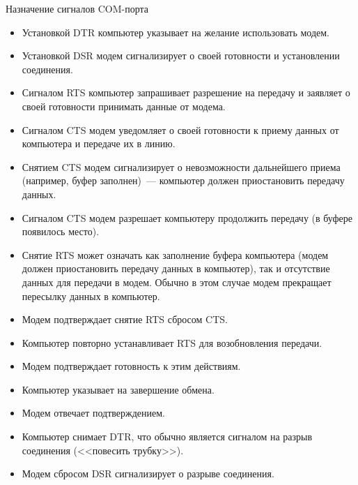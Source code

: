 \documentclass[aspectratio=169,14pt]{beamer}
\begin{document}
\begin{frame}{Назначение сигналов COM-порта}
    \begin{tiny}
        \begin{spacing}{0.8}
            \begin{itemize}
                \item Установкой DTR компьютер указывает на желание использовать
                модем.
                \item Установкой DSR модем сигнализирует о своей готовности и
                установлении соединения.
                \item Сигналом RTS компьютер запрашивает разрешение на
                передачу и заявляет о своей готовности принимать данные от модема.
                \item Сигналом CTS модем уведомляет о своей готовности к приему
                данных от компьютера и передаче их в линию.
                \item Снятием CTS модем сигнализирует о невозможности дальнейшего
                приема (например, буфер заполнен)~--- компьютер должен
                приостановить передачу данных.
                \item Сигналом CTS модем разрешает компьютеру продолжить
                передачу (в буфере появилось место).
                \item Снятие RTS может означать как заполнение буфера
                компьютера (модем должен приостановить передачу данных
                в компьютер), так и отсутствие данных для передачи в модем.
                Обычно в этом случае модем прекращает пересылку данных
                в компьютер.
                \item Модем подтверждает снятие RTS сбросом CTS.
                \item Компьютер повторно устанавливает RTS для возобновления
                передачи.
                \item Модем подтверждает готовность к этим действиям.
                \item Компьютер указывает на завершение обмена.
                \item Модем отвечает подтверждением.
                \item Компьютер снимает DTR, что обычно является сигналом на
                разрыв соединения (<<повесить трубку>>).
                \item Модем сбросом DSR сигнализирует о разрыве соединения.
            \end{itemize}
        \end{spacing}
    \end{tiny}
\end{frame}
\end{document}
